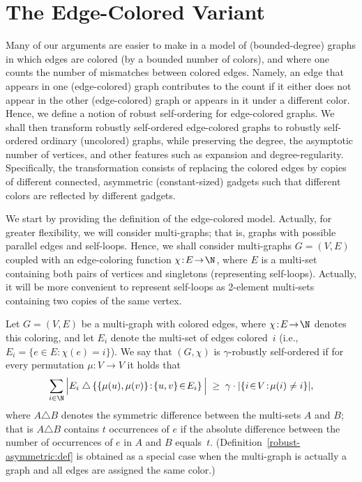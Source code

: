 \section{The Edge-Colored Variant}
\label{edge-colored:sec}
Many of our arguments are easier to make in a model
of (bounded-degree) graphs in which edges are colored
(by a bounded number of colors),
and where one counts the number of mismatches between colored edges.
Namely, an edge that appears in one (edge-colored) graph
contributes to the count if it either does not appear in the
other (edge-colored) graph or appears in it under a different color.
Hence, we define a notion of robust self-ordering for edge-colored graphs.
We shall then transform robustly self-ordered edge-colored graphs
to robustly self-ordered ordinary (uncolored) graphs,
while preserving the degree, the asymptotic number of vertices,
and other features such as expansion and degree-regularity.
Specifically, the transformation consists of replacing the
colored edges by copies of different connected,
asymmetric (constant-sized) gadgets such that different colors
are reflected by different gadgets.

We start by providing the definition of the edge-colored model.
Actually, for greater flexibility, we will consider multi-graphs;
that is, graphs with possible parallel edges and self-loops.
Hence, we shall consider multi-graphs $G=(V,E)$
coupled with an edge-coloring function $\chi\!:\!E\!\to\!\N$,
where $E$ is a multi-set containing both pairs of vertices
and singletons (representing self-loops).
Actually, it will be more convenient to represent self-loops
as 2-element multi-sets containing two copies of the same vertex.

%
\label{colored-robust:def}
Let $G=(V,E)$ be a multi-graph with colored edges,
where $\chi\!:\!E\!\to\!\N$ denotes this coloring,
and let $E_i$ denote the multi-set of edges colored~$i$
{\rm(i.e., $E_i=\{e\!\in\!E\!:\!\chi(e)\!=\!i\}$)}.
We say that $(G,\chi)$ is {\sf $\gamma$-robustly self-ordered}
if for every permutation $\mu:V\to{V}$ it holds that
\begin{equation}\label{robust4colored:eqdef}
\sum_{i\in\N}
\Big|E_i\;\triangle
       \left\{\{\mu(u),\mu(v)\}\!:\!\{u,v\}\!\in\!E_i\right\}\Big|
  \;\geq\; \gamma\cdot|\{i\!\in\!V\!:\!\mu(i)\neq i\}|,
\end{equation}
where $A\triangle B$ denotes the symmetric difference
between the multi-sets $A$ and $B$; that is $A\triangle B$
contains $t$ occurrences of $e$ if the absolute difference between
the number of occurrences of $e$ in $A$ and $B$ equals~$t$.
\ED
(Definition~\ref{robust-asymmetric:def} is obtained
as a special case when the multi-graph is actually a graph
and all edges are assigned the same color.)


